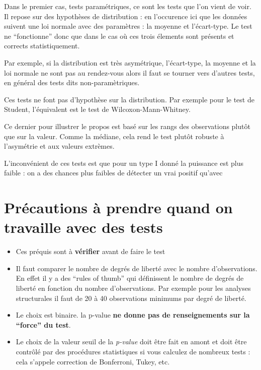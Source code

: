 \documentclass[
]{book}
\begin{document}
Dans le premier cas, tests paramétriques, ce sont les tests que l'on vient de
voir. Il repose sur des hypothèses de distribution : en l'occurence ici que
les données suivent une loi normale avec des paramètres : la moyenne et
l'écart-type. Le test ne ``fonctionne'' donc que dans le cas où ces trois
élements sont présents et corrects statistiquement.

Par exemple, si la distribution est très asymétrique, l'écart-type, la moyenne et
la loi normale ne sont pas au rendez-vous alors il faut se tourner vers d'autres
tests, en général des tests dits non-paramètriques.

Ces tests ne font pas d'hypothèse sur la distribution. Par exemple pour le test
de Student, l'équivalent est le test de Wilcoxon-Mann-Whitney.

Ce dernier pour illustrer le propos est basé sur les rangs des observations
plutôt que sur la valeur. Comme la médiane, cela rend le test plutôt robuste
à l'asymétrie et aux valeurs extrèmes.

L'inconvénient de ces tests est que pour un type I donné la puissance est plus
faible : on a des chances plus faibles de détecter un vrai positif qu'avec

\hypertarget{pruxe9cautions-uxe0-prendre-quand-on-travaille-avec-des-tests}{%
\section{Précautions à prendre quand on travaille avec des tests}\label{pruxe9cautions-uxe0-prendre-quand-on-travaille-avec-des-tests}}

\begin{itemize}
\item
  Ces préquis sont à \textbf{vérifier} avant de faire le test
\item
  Il faut comparer le nombre de degrés de liberté avec le nombre d'observations.
  En effet il y a des ``rules of thumb'' qui définissent le nombre de degrés de
  liberté en fonction du nombre d'observations. Par exemple pour les analyses
  structurales il faut de 20 à 40 observations minimums par degré de liberté.
\item
  Le choix est binaire. la p-value \textbf{ne donne pas de renseignements sur la
  ``force'' du test}.
\item
  Le choix de la valeur seuil de la \emph{p-value} doit être fait en amont et doit
  être contrôlé par des procédures statistiques si vous calculez de nombreux
  tests : cela s'appele correction de Bonferroni, Tukey, etc.
\end{itemize}

  
\end{document}
